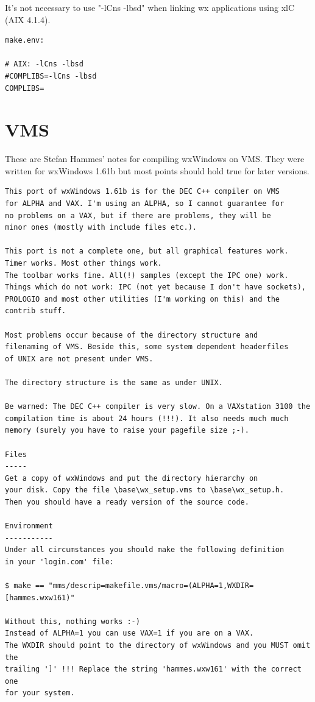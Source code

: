 It's not necessary to use "-lCns -lbsd" when linking
wx applications using xlC (AIX 4.1.4).

\begin{verbatim}
make.env:

# AIX: -lCns -lbsd
#COMPLIBS=-lCns -lbsd
COMPLIBS=
\end{verbatim}

\section{VMS}

These are Stefan Hammes' notes for compiling wxWindows on VMS.
They were written for wxWindows 1.61b but most points should hold true for later
versions.

\begin{verbatim}
This port of wxWindows 1.61b is for the DEC C++ compiler on VMS 
for ALPHA and VAX. I'm using an ALPHA, so I cannot guarantee for 
no problems on a VAX, but if there are problems, they will be 
minor ones (mostly with include files etc.).

This port is not a complete one, but all graphical features work.
Timer works. Most other things work. 
The toolbar works fine. All(!) samples (except the IPC one) work.
Things which do not work: IPC (not yet because I don't have sockets),
PROLOGIO and most other utilities (I'm working on this) and the 
contrib stuff.

Most problems occur because of the directory structure and
filenaming of VMS. Beside this, some system dependent headerfiles
of UNIX are not present under VMS.

The directory structure is the same as under UNIX.

Be warned: The DEC C++ compiler is very slow. On a VAXstation 3100 the
compilation time is about 24 hours (!!!). It also needs much much 
memory (surely you have to raise your pagefile size ;-).

Files
-----
Get a copy of wxWindows and put the directory hierarchy on
your disk. Copy the file \base\wx_setup.vms to \base\wx_setup.h.
Then you should have a ready version of the source code. 

Environment
-----------
Under all circumstances you should make the following definition
in your 'login.com' file:

$ make == "mms/descrip=makefile.vms/macro=(ALPHA=1,WXDIR=[hammes.wxw161)"

Without this, nothing works :-)
Instead of ALPHA=1 you can use VAX=1 if you are on a VAX.
The WXDIR should point to the directory of wxWindows and you MUST omit the
trailing ']' !!! Replace the string 'hammes.wxw161' with the correct one
for your system.


\end{verbatim}
